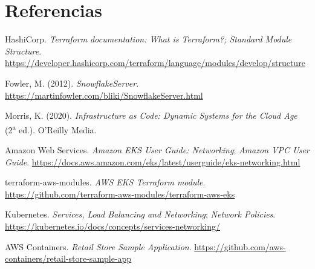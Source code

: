 \documentclass[11pt,a4paper]{article}
\begin{document}
\section{Referencias}

\begin{enumerate}[label={[\arabic*]},itemsep=0pt,topsep=1pt]\footnotesize
  \item HashiCorp. \emph{Terraform documentation: What is Terraform?; Standard Module Structure}.
    \url{https://developer.hashicorp.com/terraform/language/modules/develop/structure}
  \item Fowler, M. (2012). \emph{SnowflakeServer}.
    \url{https://martinfowler.com/bliki/SnowflakeServer.html}
  \item Morris, K. (2020). \emph{Infrastructure as Code: Dynamic Systems for the Cloud Age}
    (2\textsuperscript{a} ed.). O'Reilly Media.
  \item Amazon Web Services. \emph{Amazon EKS User Guide: Networking}; \emph{Amazon VPC User
    Guide}. \url{https://docs.aws.amazon.com/eks/latest/userguide/eks-networking.html}
  \item terraform-aws-modules. \emph{AWS EKS Terraform module}.
    \url{https://github.com/terraform-aws-modules/terraform-aws-eks}
  \item Kubernetes. \emph{Services, Load Balancing and Networking}; \emph{Network Policies}.
    \url{https://kubernetes.io/docs/concepts/services-networking/}
  \item AWS Containers. \emph{Retail Store Sample Application}.
    \url{https://github.com/aws-containers/retail-store-sample-app}
\end{enumerate}
\end{document}
